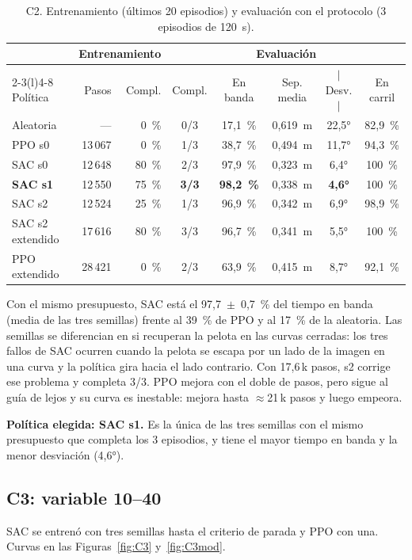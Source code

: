 \documentclass[11pt,a4paper]{article}
\begin{document}
\begin{table}[h]
\centering\small
\caption{C2. Entrenamiento (últimos 20 episodios) y evaluación con el protocolo (3 episodios de 120~s).}
\label{tab:C2}
\setlength{\tabcolsep}{3.5pt}
\begin{tabular}{@{}lrrccccc@{}}
\toprule
& \multicolumn{2}{c}{Entrenamiento} & \multicolumn{5}{c}{Evaluación} \\
\cmidrule(lr){2-3}\cmidrule(l){4-8}
Política & Pasos & Compl. & Compl. & En banda & Sep. media & $|$Desv.$|$ & En carril \\
\midrule
Aleatoria & --- & 0~\% & 0/3 & 17,1~\% & 0,619~m & 22,5° & 82,9~\% \\
PPO s0 & 13\,067 & 0~\% & 1/3 & 38,7~\% & 0,494~m & 11,7° & 94,3~\% \\
SAC s0 & 12\,648 & 80~\% & 2/3 & 97,9~\% & 0,323~m & 6,4° & 100~\% \\
\textbf{SAC s1} & 12\,550 & 75~\% & \textbf{3/3} & \textbf{98,2~\%} & 0,338~m & \textbf{4,6°} & 100~\% \\
SAC s2 & 12\,524 & 25~\% & 1/3 & 96,9~\% & 0,342~m & 6,9° & 98,9~\% \\
\midrule
SAC s2 extendido & 17\,616 & 80~\% & 3/3 & 96,7~\% & 0,341~m & 5,5° & 100~\% \\
PPO extendido & 28\,421 & 0~\% & 2/3 & 63,9~\% & 0,415~m & 8,7° & 92,1~\% \\
\bottomrule
\end{tabular}
\end{table}

Con el mismo presupuesto, SAC está el 97,7~$\pm$~0,7~\% del tiempo en banda (media de las tres semillas) frente
al 39~\% de PPO y al 17~\% de la aleatoria. Las semillas se diferencian en si recuperan la pelota en las curvas
cerradas: los tres fallos de SAC ocurren cuando la pelota se escapa por un lado de la imagen en una curva y la
política gira hacia el lado contrario. Con 17,6\,k pasos, s2 corrige ese problema y completa 3/3. PPO mejora con
el doble de pasos, pero sigue al guía de lejos y su curva es inestable: mejora hasta $\approx$21\,k pasos y
luego empeora.

\textbf{Política elegida: SAC s1.} Es la única de las tres semillas con el mismo presupuesto que completa los 3
episodios, y tiene el mayor tiempo en banda y la menor desviación (4,6°).

\subsection{C3: variable 10--40}
SAC se entrenó con tres semillas hasta el criterio de parada y PPO con una. Curvas en las
Figuras~\ref{fig:C3} y~\ref{fig:C3mod}.
\end{document}
